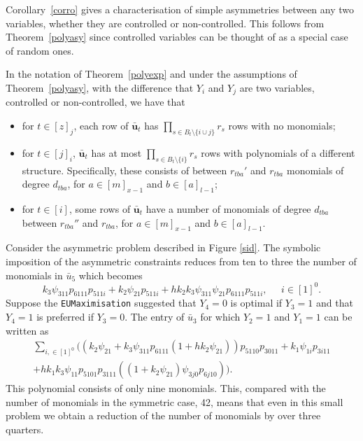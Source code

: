 {Corollary~\ref{corro} gives a  characterisation of simple asymmetries between any two variables, whether they are controlled or non-controlled. This follows  from Theorem~\ref{polyasy} since controlled variables can be thought of as a special case of random ones.

\begin{corollary}\label{corro}
In the notation of Theorem~\ref{polyexp} and under the assumptions of Theorem~\ref{polyasy}, with the difference that $Y_i$ and $Y_j$ are two variables, controlled or non-controlled, we have that
\begin{itemize}
\item for $t\in[z]_j$, each row of $\bar{\bm{u}}_t$ has $\prod_{s\in B_t\setminus \{i\cup j\}} r_s$ rows with no monomials;
\item for $t\in[j]_i$, $\bar{\bm{u}}_t$ has at most $\prod_{s\in B_t\setminus \{i\}} r_s$ rows with polynomials of a different structure. Specifically, these consists of between $r_{tba}'$ and $r_{tba}$ monomials of degree $d_{tba}$, for $a\in[m]_{x-1}$ and $b\in[a]_{l-1}$;
\item  for $t\in[i]$, some rows of $\bar{\bm{u}}_t$ have a number of monomials of degree $d_{tba}$ between $r_{tba}''$ and $r_{tba}$, for $a\in[m]_{x-1}$ and $b\in[a]_{l-1}$.
\end{itemize} 
\label{corasy}
\end{corollary}


\begin{example}
 Consider the asymmetric problem described in Figure \ref{sid}. The symbolic imposition of the asymmetric constraints reduces from ten to three the number of monomials in $\bar{u}_5$ which becomes 
\[
k_3\psi_{311}p_{6111}p_{511i}+k_2\psi_{21}p_{511i}+hk_2k_3\psi_{311}\psi_{21}p_{6111}p_{511i}, \;\;\;\;\; i\in[1]^0.
\]
Suppose the \texttt{EUMaximisation} suggested that $Y_4=0$ is optimal if $Y_3=1$ and that $Y_4=1$ is preferred if $Y_3=0$. The entry of $\bar{u}_3$ for which $Y_2=1$ and $Y_1=1$ can be written as
\begin{multline*}
\sum_{i,\in[1]^0}((k_2\psi_{21}+k_3\psi_{311}p_{6111}(1+hk_2\psi_{21}))p_{5110}p_{3011}+k_1\psi_{1i}p_{3i11}\\
+hk_1k_3\psi_{11}p_{5101}p_{3111}((1+k_2\psi_{21})\psi_{3j0}p_{6j10})).
\end{multline*}
This polynomial consists of only nine monomials. This, compared with the number of monomials in the symmetric case, 42,  means that even in this small problem we obtain a reduction  of the number of monomials by over three quarters.
\end{example}

}
